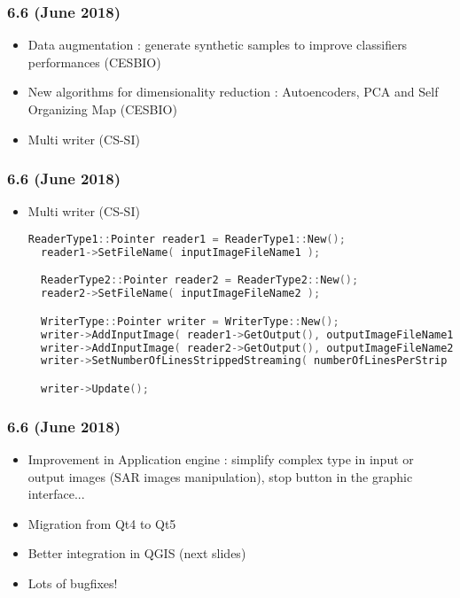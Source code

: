 \begin{frame}
  \frametitle{6.6 (June 2018)}

  \begin{itemize}
  \item Data augmentation : generate synthetic samples to improve classifiers
    performances (CESBIO)
  \item New algorithms for dimensionality reduction : Autoencoders, PCA and Self
    Organizing Map (CESBIO)
  \item Multi writer (CS-SI)
  \end{itemize}  
\end{frame}


\begin{frame}[fragile]
  \frametitle{6.6 (June 2018)}
  \begin{itemize}
    \item Multi writer (CS-SI)
  \begin{lstlisting}[language=c++,breaklines=true,breakatwhitespace=true,frame =
      tb,framerule =
      0.25pt,fontadjust,backgroundcolor={\color{listlightgray}},basicstyle =
      {\ttfamily\tiny},keywordstyle =
      {\ttfamily\color{red}\textbf},identifierstyle = {\ttfamily},commentstyle =
      {\ttfamily\color{listcomment}\textit},stringstyle =
      {\ttfamily},showstringspaces = false,showtabs = false,numbers =
      none,numbersep = 2pt, numberstyle={\ttfamily\color{listnumbers}},tabsize =
      2]
  ReaderType1::Pointer reader1 = ReaderType1::New();
  reader1->SetFileName( inputImageFileName1 );

  ReaderType2::Pointer reader2 = ReaderType2::New();
  reader2->SetFileName( inputImageFileName2 );

  WriterType::Pointer writer = WriterType::New();
  writer->AddInputImage( reader1->GetOutput(), outputImageFileName1);
  writer->AddInputImage( reader2->GetOutput(), outputImageFileName2);
  writer->SetNumberOfLinesStrippedStreaming( numberOfLinesPerStrip );

  writer->Update();

  \end{lstlisting}
  \end{itemize} 
\end{frame}

\begin{frame}
  \frametitle{6.6 (June 2018)}
  \begin{itemize}
  \item Improvement in Application engine : simplify complex type  in input or
    output images (SAR images manipulation), stop button in the graphic interface...
  \item Migration from Qt4 to Qt5
  \item Better integration in QGIS (next slides)
  \item Lots of bugfixes!
  \end{itemize}  
\end{frame}

